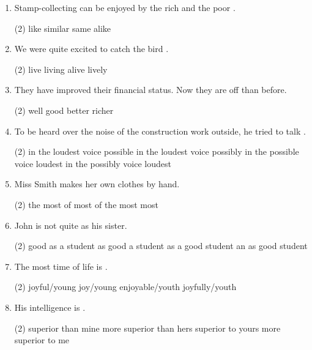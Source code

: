 \begin{enumerate}
\item Stamp-collecting can be enjoyed by the rich and the poor \ttu.
  \begin{tasks}(2)
    \task like
    \task similar
    \task same
    \task alike
  \end{tasks}

\item We were quite excited to catch the bird \ttu.
  \begin{tasks}(2)
    \task live
    \task living
    \task alive
    \task lively
  \end{tasks}

\item They have improved their financial status. Now they are \ttu off than before.
  \begin{tasks}(2)
    \task well
    \task good
    \task better
    \task richer
  \end{tasks}

\item To be heard over the noise of the construction work outside, he tried to talk \ttu.
  \begin{tasks}(2)
    \task in the loudest voice possible
    \task in the loudest voice possibly
    \task in the possible voice loudest
    \task in the possibly voice loudest
  \end{tasks}

\item Miss Smith makes \ttu her own clothes by hand.
  \begin{tasks}(2)
    \task the most of
    \task most of
    \task the most
    \task most
  \end{tasks}

\item John is not quite \ttu as his sister.
  \begin{tasks}(2)
    \task good as a student
    \task as good a student
    \task as a good student
    \task an as good student
  \end{tasks}

\item The most \ttu time of life is \ttu.
  \begin{tasks}(2)
    \task joyful/young
    \task joy/young
    \task enjoyable/youth
    \task joyfully/youth
  \end{tasks}

\item His intelligence is \ttu.
  \begin{tasks}(2)
    \task superior than mine
    \task more superior than hers
    \task superior to yours
    \task more superior to me
  \end{tasks}


\end{enumerate}
